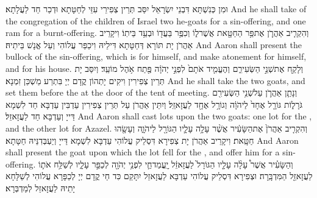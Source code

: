 {וּמִן כְּנִשְׁתָּא דִּבְנֵי יִשְׂרָאֵל יִסַּב תְּרֵין צְפִירֵי עִזֵּי לְחַטָּתָא וּדְכַר חַד לַעֲלָתָא׃}
{And he shall take of the congregation of the children of Israel two he-goats for a sin-offering, and one ram for a burnt-offering.}{}
{וְהִקְרִ֧יב אַהֲרֹ֛ן אֶת\maqqaf פַּ֥ר הַחַטָּ֖את אֲשֶׁר\maqqaf ל֑וֹ וְכִפֶּ֥ר בַּעֲד֖וֹ וּבְעַ֥ד בֵּיתֽוֹ׃}
{וִיקָרֵיב אַהֲרֹן יָת תּוֹרָא דְּחַטָּתָא דִּילֵיהּ וִיכַפַּר עֲלוֹהִי וְעַל אֱנָשׁ בֵּיתֵיהּ׃}
{And Aaron shall present the bullock of the sin-offering, which is for himself, and make atonement for himself, and for his house.}{}
{וְלָקַ֖ח אֶת\maqqaf שְׁנֵ֣י הַשְּׂעִירִ֑ם וְהֶעֱמִ֤יד אֹתָם֙ לִפְנֵ֣י יְהֹוָ֔ה פֶּ֖תַח אֹ֥הֶל מוֹעֵֽד׃}
{וְיִסַּב יָת תְּרֵין צְפִירִין וִיקִים יָתְהוֹן קֳדָם יְיָ בִּתְרַע מַשְׁכַּן זִמְנָא׃}
{And he shall take the two goats, and set them before the \lord\space at the door of the tent of meeting.}{}
{וְנָתַ֧ן אַהֲרֹ֛ן עַל\maqqaf שְׁנֵ֥י הַשְּׂעִירִ֖ם גֹּרָל֑וֹת גּוֹרָ֤ל אֶחָד֙ לַיהֹוָ֔ה וְגוֹרָ֥ל אֶחָ֖ד לַעֲזָאזֵֽל׃}
{וְיִתֵּין אַהֲרֹן עַל תְּרֵין צְפִירִין עַדְבִּין עַדְבָּא חַד לִשְׁמָא דַּייָ וְעַדְבָּא חַד לַעֲזָאזֵל׃}
{And Aaron shall cast lots upon the two goats: one lot for the \lord, and the other lot for Azazel.}{}
{וְהִקְרִ֤יב אַהֲרֹן֙ אֶת\maqqaf הַשָּׂעִ֔יר אֲשֶׁ֨ר עָלָ֥ה עָלָ֛יו הַגּוֹרָ֖ל לַיהֹוָ֑ה וְעָשָׂ֖הוּ חַטָּֽאת׃}
{וִיקָרֵיב אַהֲרֹן יָת צְפִירָא דִּסְלֵיק עֲלוֹהִי עַדְבָּא לִשְׁמָא דַּייָ וְיַעְבְּדִנֵּיהּ חַטָּתָא׃}
{And Aaron shall present the goat upon which the lot fell for the \lord, and offer him for a sin-offering.}{}
{וְהַשָּׂעִ֗יר אֲשֶׁר֩ עָלָ֨ה עָלָ֤יו הַגּוֹרָל֙ לַעֲזָאזֵ֔ל יׇֽעֳמַד\maqqaf חַ֛י לִפְנֵ֥י יְהֹוָ֖ה לְכַפֵּ֣ר עָלָ֑יו לְשַׁלַּ֥ח אֹת֛וֹ לַעֲזָאזֵ֖ל הַמִּדְבָּֽרָה׃}
{וּצְפִירָא דִּסְלֵיק עֲלוֹהִי עַדְבָּא לַעֲזָאזֵל יִתָּקַם כִּד חַי קֳדָם יְיָ לְכַפָּרָא עֲלוֹהִי לְשַׁלָּחָא יָתֵיהּ לַעֲזָאזֵל לְמַדְבְּרָא׃}
